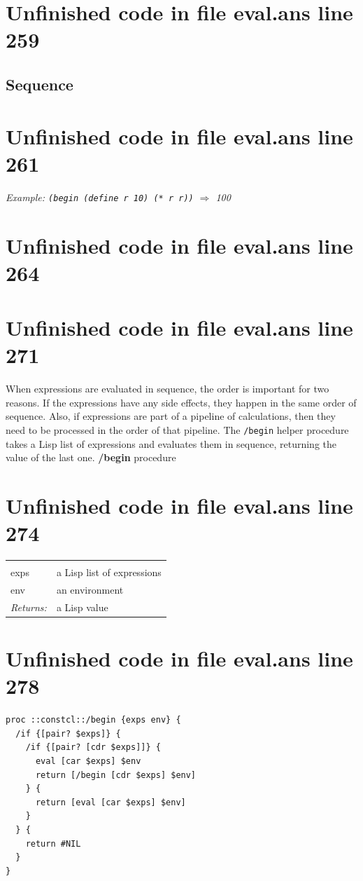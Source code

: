 \documentclass[twoside,9pt]{report}
\begin{document}
\section{Unfinished code in file eval.ans line 259}
\subsection{Sequence}
\label{sequence}
\section{Unfinished code in file eval.ans line 261}


\emph{Example: \texttt{(begin (define r 10) (* r r))} $\Rightarrow$ 100}

\section{Unfinished code in file eval.ans line 264}
\section{Unfinished code in file eval.ans line 271}

When expressions are evaluated in sequence, the order is important for two reasons. If the expressions have any side effects, they happen in the same order of sequence. Also, if expressions are part of a pipeline of calculations, then they need to be processed in the order of that pipeline. The \texttt{/begin} helper procedure takes a Lisp list of expressions and evaluates them in sequence, returning the value of the last one. \textbf{/begin} procedure

\section{Unfinished code in file eval.ans line 274}
\noindent\begin{tabular}{ |p{1.9cm} p{8cm}| }
\hline
\rowcolor[HTML]{CCCCCC} \multicolumn{2}{|l|}{\bf /begin (internal)} \\
exps & a Lisp list of expressions \\
env & an environment \\
\textit{Returns:} & a Lisp value \\
\hline
\end{tabular}
\section{Unfinished code in file eval.ans line 278}
\begin{lstlisting}
proc ::constcl::/begin {exps env} {
  /if {[pair? $exps]} {
    /if {[pair? [cdr $exps]]} {
      eval [car $exps] $env
      return [/begin [cdr $exps] $env]
    } {
      return [eval [car $exps] $env]
    }
  } {
    return #NIL
  }
}
\end{lstlisting}
\end{document}
